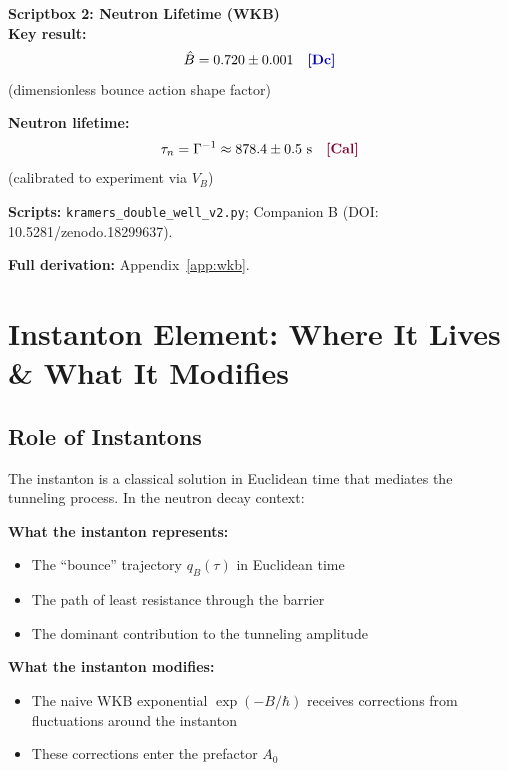 \documentclass[11pt,a4paper]{article}
\newcommand{\tagDc}{\textcolor{blue!70!black}{\textbf{[Dc]}}}
\newcommand{\tagCal}{\textcolor{purple!70!black}{\textbf{[Cal]}}}
\begin{document}
\begin{scriptbox}
\textbf{Scriptbox 2: Neutron Lifetime (WKB)}\\
\textbf{Key result:}
\begin{equation}
    \hat{B} = 0.720 \pm 0.001 \quad \tagDc{}
\end{equation}
(dimensionless bounce action shape factor)

\textbf{Neutron lifetime:}
\begin{equation}
    \tau_n = \Gamma^{-1} \approx 878.4 \pm 0.5 \text{ s} \quad \tagCal{}
\end{equation}
(calibrated to experiment via $V_B$)

\textbf{Scripts:} \texttt{kramers\_double\_well\_v2.py}; Companion B (DOI: 10.5281/zenodo.18299637).

\textbf{Full derivation:} Appendix~\ref{app:wkb}.
\end{scriptbox}
\label{sb:neutron_wkb}

\section{Instanton Element: Where It Lives \& What It Modifies}
\label{sec:instanton}

\subsection{Role of Instantons}

The instanton is a classical solution in Euclidean time that mediates the tunneling process. In the neutron decay context:

\textbf{What the instanton represents:}
\begin{itemize}
    \item The ``bounce'' trajectory $q_B(\tau)$ in Euclidean time
    \item The path of least resistance through the barrier
    \item The dominant contribution to the tunneling amplitude
\end{itemize}

\textbf{What the instanton modifies:}
\begin{itemize}
    \item The naive WKB exponential $\exp(-B/\hbar)$ receives corrections from fluctuations around the instanton
    \item These corrections enter the prefactor $A_0$
\end{itemize}
\end{document}
